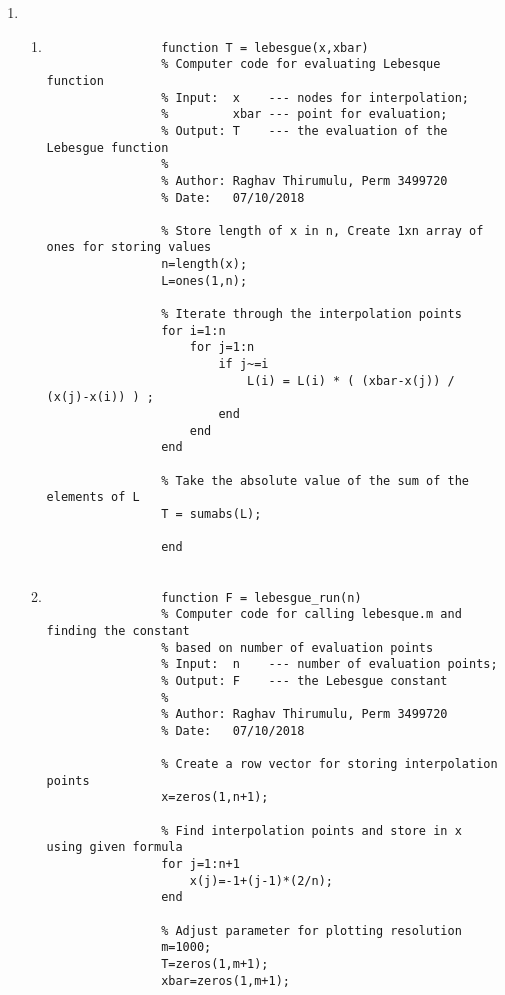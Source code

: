 \documentclass{article}
\begin{document}
\begin{enumerate}
    \item %
        \begin{enumerate}
            \item %
                \begin{lstlisting}
                function T = lebesgue(x,xbar) 
                % Computer code for evaluating Lebesque function
                % Input:  x    --- nodes for interpolation;
                %         xbar --- point for evaluation;
                % Output: T    --- the evaluation of the Lebesgue function
                %
                % Author: Raghav Thirumulu, Perm 3499720
                % Date:   07/10/2018
                
                % Store length of x in n, Create 1xn array of ones for storing values
                n=length(x);
                L=ones(1,n);

                % Iterate through the interpolation points
                for i=1:n
                    for j=1:n
                        if j~=i
                            L(i) = L(i) * ( (xbar-x(j)) / (x(j)-x(i)) ) ;
                        end
                    end
                end

                % Take the absolute value of the sum of the elements of L
                T = sumabs(L);

                end
                
                \end{lstlisting}
            
            \item %
                \begin{lstlisting}
                function F = lebesgue_run(n)
                % Computer code for calling lebesque.m and finding the constant
                % based on number of evaluation points
                % Input:  n    --- number of evaluation points;
                % Output: F    --- the Lebesgue constant
                %
                % Author: Raghav Thirumulu, Perm 3499720
                % Date:   07/10/2018

                % Create a row vector for storing interpolation points
                x=zeros(1,n+1);

                % Find interpolation points and store in x using given formula
                for j=1:n+1
                    x(j)=-1+(j-1)*(2/n);
                end

                % Adjust parameter for plotting resolution
                m=1000;
                T=zeros(1,m+1);
                xbar=zeros(1,m+1);


\end{lstlisting}
\end{enumerate}
\end{enumerate}
\end{document}
